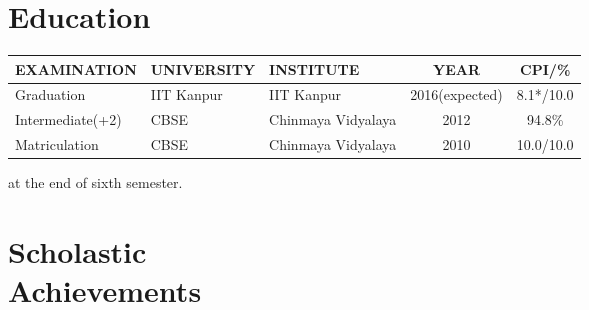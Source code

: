 \documentclass[margin,10pt]{resume}
\renewcommand{\baselinestretch}{1.2}
\begin{document}
\address{\small Final Year Undergraduate\\\small Computer Science and Engineering \\\small Indian Institute of Technology Kanpur}
\address{\small phone: +918765162302\\\small email: ksaurav@iitk.ac.in, 2020saurav@gmail.com\\\small homepage: \url{http://home.iitk.ac.in/~ksaurav}}

\begin{resume}
\section{\mysidestyle Education}
\vspace{2mm}
\begin{table}[h]
\renewcommand{\arraystretch}{1.5}
\vspace{5mm}
\begin{tabularx}{\textwidth}{X X l c c}
\hline

EXAMINATION      & UNIVERSITY & INSTITUTE          & YEAR           & CPI/\%    \\ \hline

Graduation       & IIT Kanpur & IIT Kanpur         & 2016(expected) & 8.1*/10.0 \\ \hline

Intermediate(+2) & CBSE       & Chinmaya Vidyalaya & 2012           & 94.8\%    \\ \hline

Matriculation    & CBSE       & Chinmaya Vidyalaya & 2010           & 10.0/10.0    \\ \hline

\end{tabularx}

{\vspace{2mm}\small * at the end of sixth semester.}
\end{table}

\vspace{-2mm}
\section{\mysidestyle Scholastic\\Achievements}

\begin{list2}
\begin{spacing}{1.4}
\renewcommand{\baselinestretch}{1.3}


\end{spacing}
\end{list2}
\end{resume}
\end{document}
